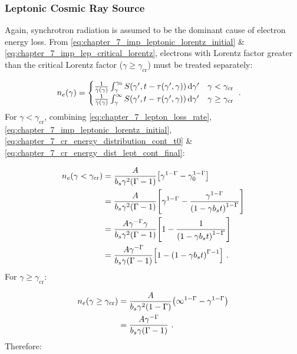 \subsubsection{Leptonic Cosmic Ray Source}
Again, synchrotron radiation is assumed to be the dominant cause of electron energy loss. From \autoref{eq:chapter_7_imp_leptonic_lorentz_initial} \& \autoref{eq:chapter_7_imp_lep_critical_lorentz}, electrons with Lorentz factor greater than the critical Lorentz factor ($\gamma\geq\gamma_\text{cr}$) must be treated separately:

\begin{equation}
    \begin{aligned}
    	n_e\qty(\gamma)&=
	\begin{cases}
	\frac{1}{\dot{\gamma}\qty(\gamma)}\int_{\gamma}^{\gamma_0}S\qty(\gamma',t-\tau\qty(\gamma',\gamma))\dd{\gamma'}  &\gamma < \gamma_\text{cr}\\
	\frac{1}{\dot{\gamma}\qty(\gamma)}\int_{\gamma}^{\infty}S\qty(\gamma',t-\tau\qty(\gamma',\gamma))\dd{\gamma'} &\gamma \geq \gamma_\text{cr}\\
	\end{cases}\text{ .} \label{eq:chapter_7_cr_energy_dist_lept_cont_final}
    \end{aligned}
\end{equation}
\noindent For $\gamma < \gamma_\text{cr}$, combining \autoref{eq:chapter_7_lepton_loss_rate}, \autoref{eq:chapter_7_imp_leptonic_lorentz_initial}, \autoref{eq:chapter_7_cr_energy_distribution_cont_t0} \& \autoref{eq:chapter_7_cr_energy_dist_lept_cont_final}:

\begin{equation}
    \begin{aligned}
    	n_e\qty(\gamma< \gamma_\text{cr})&=\frac{A}{b_s\gamma^2\qty(\Gamma-1)}\qty[\gamma^{1-\Gamma}-\gamma_0^{1-\Gamma}] \\
	&=\frac{A}{b_s\gamma^2\qty(\Gamma-1)}\qty[\gamma^{1-\Gamma}-\frac{\gamma^{1-\Gamma}}{\qty(1-\gamma b_s t)^{1-\Gamma}}] \\
	&=\frac{A\gamma^{-\Gamma}\gamma}{b_s\gamma^2\qty(\Gamma-1)}\qty[1-\frac{1}{\qty(1-\gamma b_s t)^{1-\Gamma}}] \\
	&=\frac{A\gamma^{-\Gamma}}{b_s\gamma\qty(\Gamma-1)}\qty[1-\qty(1-\gamma b_s t)^{\Gamma-1}]\text{ .}
    \end{aligned}
\end{equation}
\noindent For $\gamma \geq \gamma_\text{cr}$:

\begin{equation}
    \begin{aligned}
    n_e\qty(\gamma\geq \gamma_\text{cr})&=\frac{A}{b_s\gamma^2\qty(1-\Gamma)}\qty(\infty^{1-\Gamma}-\gamma^{1-\Gamma}) \\
	&=\frac{A\gamma^{-\Gamma}}{b_s\gamma\qty(\Gamma-1)}\text{ .}
    \end{aligned}
\end{equation}
\noindent Therefore:

